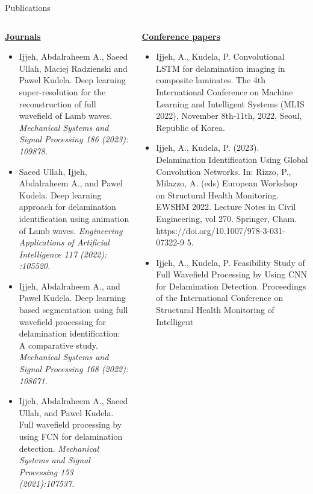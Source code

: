 \documentclass[10pt,aspectratio=169,dvipsnames]{beamer} %
\begin{document}
	\begin{frame}{Publications}
		\begin{tiny}					
			\begin{columns}[T]
				\begin{column}[t]{0.48\textwidth}
					\underline{\textbf{Journals}}
					\begin{itemize}
						\item {Ijjeh, Abdalraheem A.}, Saeed Ullah, Maciej Radzienski and Pawel Kudela. Deep learning super-resolution for the reconstruction of full wavefield of Lamb waves. \textit{Mechanical Systems and Signal Processing 186 (2023): 109878.}
						\item Saeed Ullah, {Ijjeh, Abdalraheem A.}, and Pawel Kudela. Deep learning approach for delamination identification	using animation of Lamb waves. \textit{Engineering Applications of Artificial Intelligence 117 (2022): :105520.}
						\item {Ijjeh, Abdalraheem A.}, and Pawel Kudela. Deep learning based segmentation using full wavefield processing for delamination identification: A comparative study. \textit{Mechanical Systems and Signal Processing 168 (2022): 108671.}
						\item {Ijjeh, Abdalraheem A.}, Saeed Ullah, and Pawel Kudela. Full wavefield processing by using FCN for delamination detection. 
						\textit{Mechanical Systems and Signal Processing 153  (2021):107537.}						
					\end{itemize}					
				\end{column}
				\begin{column}[t]{0.48\textwidth}
					\underline{\textbf{Conference papers}}
					\begin{itemize}
						\item {Ijjeh, A.}, Kudela, P. Convolutional LSTM for delamination imaging in composite laminates. 
						The 4th International Conference on Machine Learning and Intelligent Systems (MLIS 2022), November 8th-11th, 2022, Seoul, Republic of Korea.
						\item {Ijjeh, A.}, Kudela, P. (2023). Delamination Identification Using Global Convolution Networks. In: Rizzo,
						P., Milazzo, A. (eds) European Workshop on Structural Health Monitoring. EWSHM 2022. Lecture Notes
						in Civil Engineering, vol 270. Springer, Cham. https://doi.org/10.1007/978-3-031-07322-9 5.		
						\item {Ijjeh, A.}, Kudela, P. Feasibility Study of Full Wavefield Processing by Using CNN for Delamination
						Detection. 
						Proceedings of the International Conference on Structural Health Monitoring of Intelligent

\end{itemize}
\end{column}
\end{columns}
\end{tiny}
\end{frame}
\end{document}
